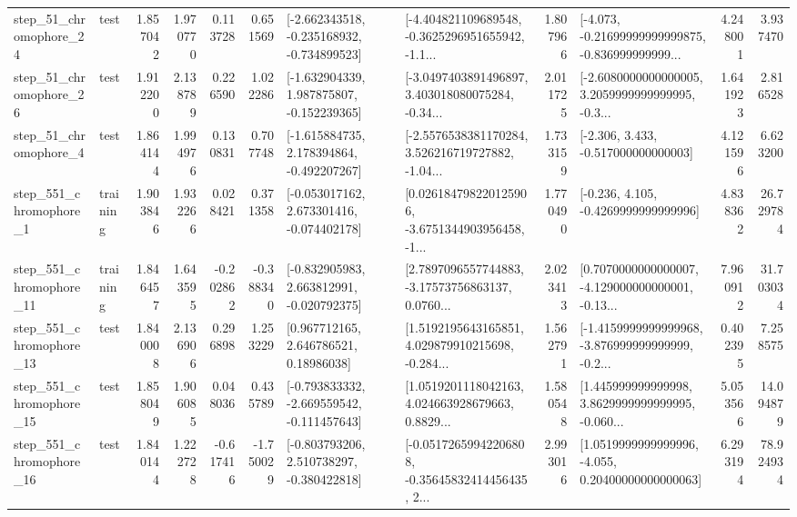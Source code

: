 \begin{tabular}{llrrrrllrlrr}
   step\_51\_chromophore\_24 &      test &      1.857042 &    1.970770 &      0.113728 &  0.651569 &  [-2.662343518, -0.235168932, -0.734899523] &  [-4.404821109689548, -0.3625296951655942, -1.1... &       1.807966 &  [-4.073, -0.21699999999999875, -0.836999999999... &            4.248001 &          3.937470 \\
   step\_51\_chromophore\_26 &      test &      1.912200 &    2.138789 &      0.226590 &  1.022286 &   [-1.632904339, 1.987875807, -0.152239365] &  [-3.0497403891496897, 3.403018080075284, -0.34... &       2.011725 &  [-2.6080000000000005, 3.2059999999999995, -0.3... &            1.641923 &          2.816528 \\
    step\_51\_chromophore\_4 &      test &      1.864144 &    1.994976 &      0.130831 &  0.707748 &   [-1.615884735, 2.178394864, -0.492207267] &  [-2.5576538381170284, 3.526216719727882, -1.04... &       1.733159 &                [-2.306, 3.433, -0.517000000000003] &            4.121596 &          6.623200 \\
   step\_551\_chromophore\_1 &  training &      1.903846 &    1.932266 &      0.028421 &  0.371358 &   [-0.053017162, 2.673301416, -0.074402178] &  [0.026184798220125906, -3.6751344903956458, -1... &       1.770490 &               [-0.236, 4.105, -0.4269999999999996] &            4.838362 &         26.729784 \\
  step\_551\_chromophore\_11 &  training &      1.846457 &    1.643595 &     -0.202862 & -0.388340 &   [-0.832905983, 2.663812991, -0.020792375] &  [2.7897096557744883, -3.17573756863137, 0.0760... &       2.023413 &  [0.7070000000000007, -4.129000000000001, -0.13... &            7.960912 &         31.703034 \\
  step\_551\_chromophore\_13 &      test &      1.840008 &    2.136906 &      0.296898 &  1.253229 &      [0.967712165, 2.646786521, 0.18986038] &  [1.5192195643165851, 4.029879910215698, -0.284... &       1.562791 &  [-1.4159999999999968, -3.876999999999999, -0.2... &            0.402395 &          7.258575 \\
  step\_551\_chromophore\_15 &      test &      1.858049 &    1.906085 &      0.048036 &  0.435789 &  [-0.793833332, -2.669559542, -0.111457643] &  [1.0519201118042163, 4.024663928679663, 0.8829... &       1.580548 &  [1.445999999999998, 3.8629999999999995, -0.060... &            5.053566 &         14.094879 \\
  step\_551\_chromophore\_16 &      test &      1.840144 &    1.222728 &     -0.617416 & -1.750029 &   [-0.803793206, 2.510738297, -0.380422818] &  [-0.05172659942206808, -0.35645832414456435, 2... &       2.993016 &  [1.0519999999999996, -4.055, 0.20400000000000063] &            6.293194 &         78.924934 \\

\end{tabular}
